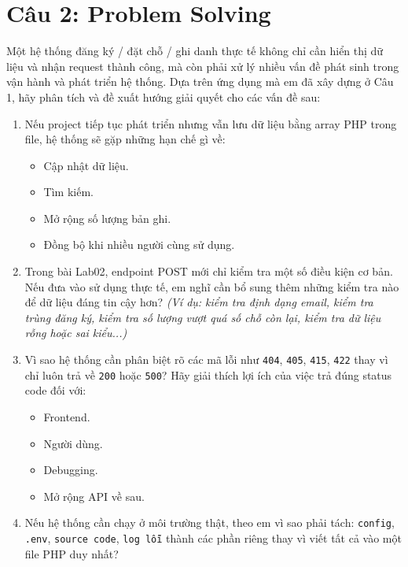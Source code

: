 \documentclass[12pt,a4paper]{article}
\begin{document}
\section*{Câu 2: Problem Solving}

Một hệ thống đăng ký / đặt chỗ / ghi danh thực tế không chỉ cần hiển thị dữ liệu và nhận request thành công, mà còn phải xử lý nhiều vấn đề phát sinh trong vận hành và phát triển hệ thống. Dựa trên ứng dụng mà em đã xây dựng ở Câu 1, hãy phân tích và đề xuất hướng giải quyết cho các vấn đề sau:

\begin{enumerate}
    \item Nếu project tiếp tục phát triển nhưng vẫn lưu dữ liệu bằng array PHP trong file, hệ thống sẽ gặp những hạn chế gì về:
    \begin{itemize}[noitemsep]
        \item Cập nhật dữ liệu.
        \item Tìm kiếm.
        \item Mở rộng số lượng bản ghi.
        \item Đồng bộ khi nhiều người cùng sử dụng.
    \end{itemize}

    \item Trong bài Lab02, endpoint POST mới chỉ kiểm tra một số điều kiện cơ bản. Nếu đưa vào sử dụng thực tế, em nghĩ cần bổ sung thêm những kiểm tra nào để dữ liệu đáng tin cậy hơn?
    \textit{(Ví dụ: kiểm tra định dạng email, kiểm tra trùng đăng ký, kiểm tra số lượng vượt quá số chỗ còn lại, kiểm tra dữ liệu rỗng hoặc sai kiểu...)}

    \item Vì sao hệ thống cần phân biệt rõ các mã lỗi như \texttt{404}, \texttt{405}, \texttt{415}, \texttt{422} thay vì chỉ luôn trả về \texttt{200} hoặc \texttt{500}? Hãy giải thích lợi ích của việc trả đúng status code đối với:
    \begin{itemize}[noitemsep]
        \item Frontend.
        \item Người dùng.
        \item Debugging.
        \item Mở rộng API về sau.
    \end{itemize}

    \item Nếu hệ thống cần chạy ở môi trường thật, theo em vì sao phải tách: \texttt{config}, \texttt{.env}, \texttt{source code}, \texttt{log lỗi} thành các phần riêng thay vì viết tất cả vào một file PHP duy nhất?


\end{enumerate}
\end{document}
